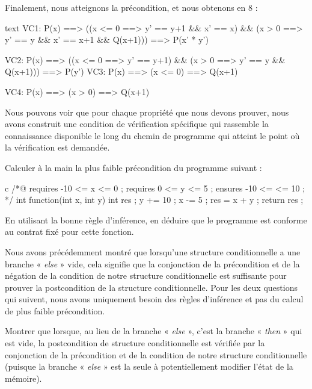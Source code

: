Finalement, nous atteignons la précondition, et nous obtenons en 8 :
\begin{CodeBlock}{text}
  VC1:
    P(x) ==>
      ((x <= 0 ==> y' == y+1 && x' == x) &&
       (x >  0 ==> y' == y   && x' == x+1 && Q(x+1))) ==>
         P(x' * y')

  VC2:
    P(x) ==>
      ((x <= 0 ==> y' == y+1) &&
       (x >  0 ==> y' == y    && Q(x+1))) ==>
         P(y')
  VC3:
    P(x) ==> (x <= 0) ==> Q(x+1)

  VC4:
    P(x) ==> (x >  0) ==> Q(x+1)
\end{CodeBlock}


Nous pouvons voir que pour chaque propriété que nous devons prouver, nous avons
construit une condition de vérification spécifique qui rassemble la connaissance
disponible le long du chemin de programme qui atteint le point où la vérification
est demandée.






Calculer à la main la plus faible précondition du programme suivant :


\begin{CodeBlock}{c}
/*@
  requires -10 <= x <= 0 ;
  requires 0 <= y <= 5 ;
  ensures -10 <= \result <= 10 ;
*/
int function(int x, int y){
  int res ;
  y += 10 ;
  x -= 5 ;
  res = x + y ;
  return res ;
}
\end{CodeBlock}


En utilisant la bonne règle d'inférence, en déduire que le programme est
conforme au contrat fixé pour cette fonction.




Nous avons précédemment montré que lorsqu'une structure conditionnelle a une branche
« \textit{else} » vide, cela signifie que la conjonction de la précondition et de la négation
de la condition de notre structure conditionnelle est suffisante pour prouver la
postcondition de la structure conditionnelle.
Pour les deux questions qui suivent, nous avons uniquement besoin des règles d'inférence
et pas du calcul de plus faible précondition.


Montrer que lorsque, au lieu de la branche « \textit{else} », c'est la branche « \textit{then} » qui est
vide, la postcondition de structure conditionnelle est vérifiée par la conjonction de
la précondition et de la condition de notre structure conditionnelle (puisque
la branche « \textit{else} » est la seule à potentiellement modifier l'état de
la mémoire).


